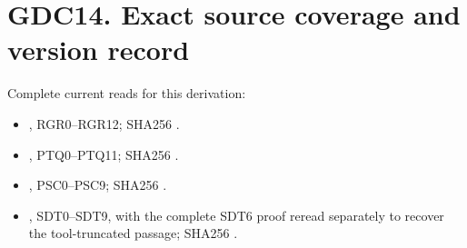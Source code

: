 \section{GDC14. Exact source coverage and version
record}\label{gdc14.-exact-source-coverage-and-version-record}

Complete current reads for this derivation:

\begin{itemize}
\tightlist
\item
  \href{https://github.com/KokunoYumeto/zeta-function-research-reader/blob/36a82ecca98addb8a98b48204e349737856c7223/workbenches/splitzero-tandem/continuations/20260924-cohomology-weight-and-character-lifts/gct-weight-control/proofs/CC_RESIDUE_GYSIN_RECEIVER_INDEPENDENT.md}{},
  RGR0--RGR12; SHA256
  .
\item
  \href{https://github.com/KokunoYumeto/zeta-function-research-reader/blob/36a82ecca98addb8a98b48204e349737856c7223/workbenches/splitzero-tandem/continuations/20260924-cohomology-weight-and-character-lifts/geometric-positive-quotient/POSITIVE_TRANSFER_UNIVERSAL_QUOTIENT.md}{},
  PTQ0--PTQ11; SHA256
  .
\item
  \href{https://github.com/KokunoYumeto/zeta-function-research-reader/blob/36a82ecca98addb8a98b48204e349737856c7223/workbenches/splitzero-tandem/continuations/20260924-cohomology-weight-and-character-lifts/geometric-positive-quotient/POSITIVE_QUOTIENT_SOURCE_AND_ARITHMETIC.md}{},
  PSC0--PSC9; SHA256
  .
\item
  \href{https://github.com/KokunoYumeto/zeta-function-research-reader/blob/36a82ecca98addb8a98b48204e349737856c7223/workbenches/splitzero-tandem/continuations/20260924-cohomology-weight-and-character-lifts/gct-weight-control/proofs/CC_STRONG_DUAL_TOPOLOGY_AND_JETS.md}{},
  SDT0--SDT9, with the complete SDT6 proof reread separately to recover
  the tool-truncated passage; SHA256
  .
\end{itemize}

